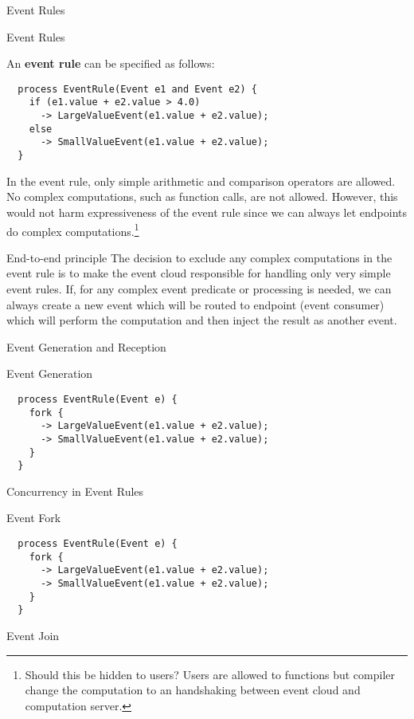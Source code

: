 \documentclass[10pt]{beamer}
\begin{document}
\begin{frame}[fragile]{Event Rules}

\begin{block}{Event Rules}

An {\bf event rule} can be specified as follows:

{\scriptsize
\begin{verbatim}
  process EventRule(Event e1 and Event e2) {
    if (e1.value + e2.value > 4.0) 
      -> LargeValueEvent(e1.value + e2.value);
    else
      -> SmallValueEvent(e1.value + e2.value);
  }
\end{verbatim}
}
In the event rule, only simple arithmetic and comparison operators are
allowed. No complex computations, such as function calls, are not
allowed. However, this would not harm expressiveness of the event rule since
we can always let endpoints do complex computations.\footnote{Should this be
  hidden to users? Users are allowed to functions but compiler change the
  computation to an handshaking between event cloud and computation server.}
\end{block}

\begin{block}{End-to-end principle}
The decision to exclude any complex computations in the event rule is to make
the event cloud responsible for handling only very simple event rules. If, for
any complex event predicate or processing is needed, we can always create a
new event which will be routed to endpoint (event consumer) which will perform
the computation and then inject the result as another event.
\end{block}
\end{frame}


\begin{frame}[fragile]{Event Generation and Reception}

\begin{block}{Event Generation}

{\scriptsize
\begin{verbatim}
  process EventRule(Event e) {
    fork {
      -> LargeValueEvent(e1.value + e2.value);
      -> SmallValueEvent(e1.value + e2.value);
    }
  }
\end{verbatim}

}

\end{block}
\end{frame}

\begin{frame}[fragile]{Concurrency in Event Rules}
\begin{block}{Event Fork}

{\scriptsize
\begin{verbatim}
  process EventRule(Event e) {
    fork {
      -> LargeValueEvent(e1.value + e2.value);
      -> SmallValueEvent(e1.value + e2.value);
    }
  }
\end{verbatim}
}

\end{block}

\begin{block}{Event Join}
\end{block}

\end{frame}
\end{document}
